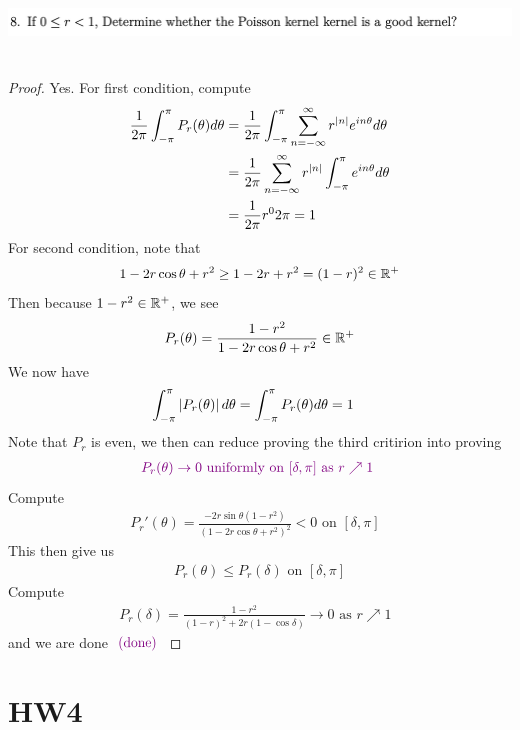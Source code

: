 \documentclass{report}
\begin{document}
\begin{question}{}{}
\includegraphics[height=2cm,width=18cm]{hw3q8}
\end{question}
\begin{proof}
Yes. For first condition, compute 
\begin{align*}
\frac{1}{2\pi}\int_{-\pi}^{\pi} P_r(\theta)d\theta &=\frac{1}{2\pi}\int_{-\pi}^{\pi}\sum_{n=-\infty}^{\infty}r^{\left|n\right|}e^{i n\theta}d\theta\\
&=\frac{1}{2\pi}\sum_{n=-\infty}^{\infty}r^{\left|n\right|}\int_{-\pi}^{\pi}e^{i n \theta}d\theta\\
&=\frac{1}{2\pi}r^0 2\pi=1
\end{align*}
For second condition, note that 
\begin{align*}
1-2r \cos \theta+r^2\geq 1-2r+r^2=(1-r)^2\in\mathbb{R}^+
\end{align*}
Then because $1-r^2\in\mathbb{R}^+$, we see 
\begin{align*}
P_r(\theta)=\frac{1-r^2}{1-2r\cos \theta+r^2}\in\mathbb{R}^+
\end{align*}
We now have 
\begin{align*}
  \int_{-\pi}^{\pi}\left|P_r(\theta)\right|d\theta &=\int_{-\pi}^{\pi}P_r(\theta)d\theta=1
\end{align*}
Note that $P_r$ is even, we then can reduce proving the third critirion into proving 
\begin{align*}
\textcolor{violet}{P_r(\theta)\to 0\text{ uniformly on $[\delta,\pi]$ as $r\nearrow 1$ }}
\end{align*}
Compute 
\begin{align*}
P_r'(\theta)=\frac{-2r \sin \theta (1-r^2)}{(1-2r \cos \theta + r^2)^2}<0\text{ on $[\delta,\pi]$ }
\end{align*}
This then give us 
\begin{align*}
P_r(\theta)\leq P_r(\delta)\text{ on }[\delta,\pi]
\end{align*}
Compute 
\begin{align*}
P_r(\delta)=\frac{1-r^2}{(1-r)^2+2r(1-\cos \delta)}\to 0\text{ as $r\nearrow 1$ }
\end{align*}
and we are done $\textcolor{violet}{\text{ (done) }}$
\end{proof}
\section{HW4}
\end{document}

